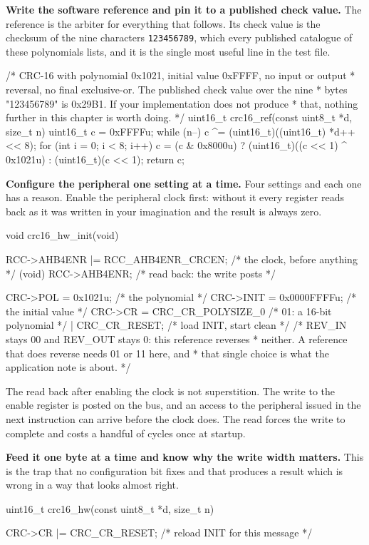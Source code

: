 \begin{steps}
\item \textbf{Write the software reference and pin it to a published check
value.} The reference is the arbiter for everything that follows. Its check
value is the checksum of the nine characters \texttt{123456789}, which every
published catalogue of these polynomials lists, and it is the single most useful
line in the test file.
\begin{ccode}
/* CRC-16 with polynomial 0x1021, initial value 0xFFFF, no input or output
 * reversal, no final exclusive-or. The published check value over the nine
 * bytes "123456789" is 0x29B1. If your implementation does not produce
 * that, nothing further in this chapter is worth doing. */
uint16_t crc16_ref(const uint8_t *d, size_t n)
{
    uint16_t c = 0xFFFFu;
    while (n--) {
        c ^= (uint16_t)((uint16_t) *d++ << 8);
        for (int i = 0; i < 8; i++)
            c = (c & 0x8000u) ? (uint16_t)((c << 1) ^ 0x1021u)
                              : (uint16_t)(c << 1);
    }
    return c;
}
\end{ccode}

\item \textbf{Configure the peripheral one setting at a time.} Four settings
and each one has a reason. Enable the peripheral clock first: without it every
register reads back as it was written in your imagination and the result is
always zero.
\begin{ccode}
void crc16_hw_init(void)
{
    RCC->AHB4ENR |= RCC_AHB4ENR_CRCEN;    /* the clock, before anything   */
    (void) RCC->AHB4ENR;                  /* read back: the write posts   */

    CRC->POL  = 0x1021u;                  /* the polynomial               */
    CRC->INIT = 0x0000FFFFu;              /* the initial value            */
    CRC->CR   = CRC_CR_POLYSIZE_0         /* 01: a 16-bit polynomial      */
              | CRC_CR_RESET;             /* load INIT, start clean       */
    /* REV_IN stays 00 and REV_OUT stays 0: this reference reverses
     * neither. A reference that does reverse needs 01 or 11 here, and
     * that single choice is what the application note is about. */
}
\end{ccode}
The read back after enabling the clock is not superstition. The write to the
enable register is posted on the bus, and an access to the peripheral issued in
the next instruction can arrive before the clock does. The read forces the write
to complete and costs a handful of cycles once at startup.

\item \textbf{Feed it one byte at a time and know why the write width
matters.} This is the trap that no configuration bit fixes and that produces a
result which is wrong in a way that looks almost right.
\begin{ccode}
uint16_t crc16_hw(const uint8_t *d, size_t n)
{
    CRC->CR |= CRC_CR_RESET;              /* reload INIT for this message */

}
\end{ccode}
\end{steps}
